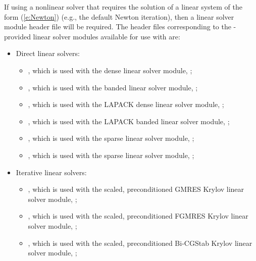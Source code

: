 If using a nonlinear solver that requires the solution of a linear
system of the form (\ref{e:Newton}) (e.g., the default Newton iteration),
then a linear solver module header file will be required.
The header files corresponding to the {\sundials}-provided linear
solver modules available for use with {\cvode} are:
\begin{itemize}
\item Direct linear solvers:
  \begin{itemize}
  \item {},
    which is used with the dense linear solver module,
    {\sunlinsoldense};

  \item {},
    which is used with the banded linear solver module,
    {\sunlinsolband};

  \item {},
    which is used with the LAPACK dense linear solver module,
    {\sunlinsollapdense};

  \item {},
    which is used with the LAPACK banded linear solver module,
    {\sunlinsollapband};

  \item {},
    which is used with the {\klu} sparse linear solver module,
    {\sunlinsolklu};

  \item {},
    which is used with the {\superlumt} sparse linear solver
    module, {\sunlinsolslumt};
  \end{itemize}

\item Iterative linear solvers:
  \begin{itemize}
  \item {},
    which is used with the scaled, preconditioned GMRES Krylov linear
    solver module, {\sunlinsolspgmr};

  \item {},
    which is used with the scaled, preconditioned FGMRES Krylov linear
    solver module, {\sunlinsolspfgmr};

  \item {},
    which is used with the scaled, preconditioned Bi-CGStab Krylov
    linear solver module, {\sunlinsolspbcgs};


\end{itemize}
\end{itemize}
